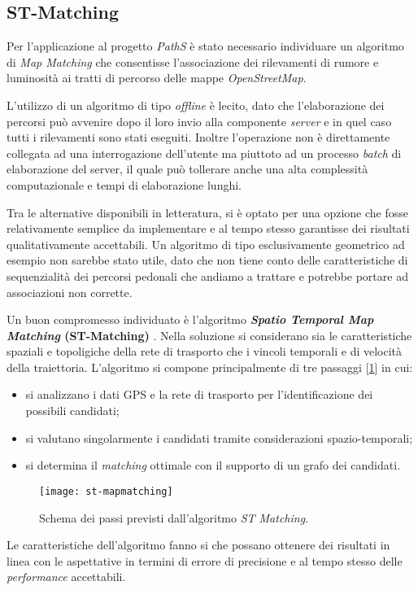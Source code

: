 \subsection{ST-Matching}
Per l'applicazione al progetto \emph{PathS} è stato necessario individuare un algoritmo di \emph{Map Matching} che consentisse l'associazione dei rilevamenti di rumore e luminosità ai tratti di percorso delle mappe \emph{OpenStreetMap}. 

L'utilizzo di un algoritmo di tipo \emph{offline} è lecito, dato che l'elaborazione dei percorsi può avvenire dopo il loro invio alla componente \emph{server} e in quel caso tutti i rilevamenti sono stati eseguiti. Inoltre l'operazione non è direttamente collegata ad una interrogazione dell'utente ma piuttoto ad un processo \emph{batch} di elaborazione del server, il quale può tollerare anche una alta complessità computazionale e tempi di elaborazione lunghi.

Tra le alternative disponibili in letteratura, si è optato per una opzione che fosse relativamente semplice da implementare e al tempo stesso garantisse dei risultati qualitativamente accettabili. Un algoritmo di tipo esclusivamente geometrico ad esempio non sarebbe stato utile, dato che non tiene conto delle caratteristiche di sequenzialità dei percorsi pedonali che andiamo a trattare e potrebbe portare ad associazioni non corrette.

Un buon compromesso individuato è l'algoritmo \textbf{\emph{Spatio Temporal Map Matching} (ST-Matching)} \cite{stmapmatching}. Nella soluzione si considerano sia le caratteristiche spaziali e topoligiche della rete di trasporto che i vincoli temporali e di velocità della traiettoria. L'algoritmo si compone principalmente di tre passaggi [\ref{fig:st-mapmatching}] in cui:
\begin{itemize}
	\item si analizzano i dati GPS e la rete di trasporto per l'identificazione dei possibili candidati;
	\item si valutano singolarmente i candidati tramite considerazioni spazio-temporali;
	\item si determina il \emph{matching} ottimale con il supporto di un grafo dei candidati.
\end{itemize}
\begin{figure}[h]
  \centering
  \texttt{[image: st-mapmatching]}
  \caption{\footnotesize{Schema dei passi previsti dall'algoritmo \emph{ST Matching}.}}
  \label{fig:st-mapmatching}
\end{figure}
Le caratteristiche dell'algoritmo fanno si che possano ottenere dei risultati in linea con le aspettative in termini di errore di precisione e al tempo stesso delle \emph{performance} accettabili. 

